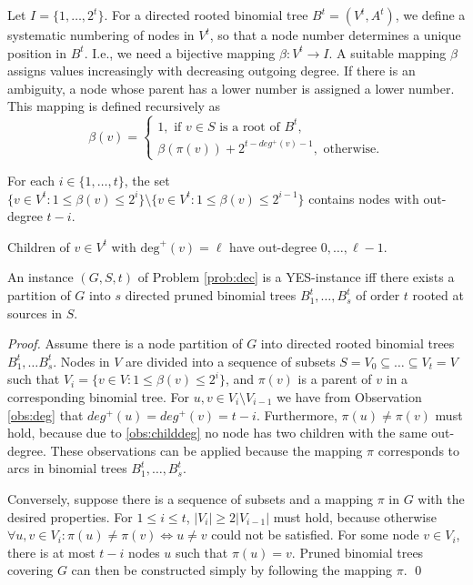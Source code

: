 Let $I=\{1,\dots,2^t\}$.
For a directed rooted binomial tree $B^t=(V^t,A^t)$, we define a systematic numbering of nodes in $V^t$, so that a node number determines a unique position in $B^t$.
I.e., we need a bijective mapping $\beta: V^t \to I$.
A suitable mapping $\beta$ assigns values increasingly with decreasing outgoing degree. 
If there is an ambiguity, a node whose parent has a lower number is assigned a lower number.
This mapping is defined recursively as
\begin{equation}
\label{eq:beta}
\beta(v)=\begin{cases}
1,\text{ if } v\in S \text{ is a root of } B^t,\\
\beta(\pi(v)) + 2^{t-deg^+(v)-1}, \text{ otherwise}.
\end{cases}
\end{equation}
\begin{observation}\label{obs:deg}
For each $i\in\{1,\dots,t\}$, the set $\{v\in V^t: 1\leq\beta(v)\leq2^i\}\setminus\{v\in V^t:1\leq\beta(v)\leq2^{i-1}\}$ contains nodes with out-degree $t-i$.
\end{observation}
\begin{observation}\label{obs:childdeg}
Children of $v\in V^t$ with $\text{deg}^+(v)=\ell$ have out-degree $0,\dots,\ell-1$.
\end{observation}
\begin{proposition}\label{lem:probeq}
An instance $(G,S,t)$ of Problem \ref{prob:dec} is a YES-instance iff 
there exists a partition of $G$ into $s$ directed pruned binomial trees $B^t_1,\dots,B^t_{s}$ of order $t$ rooted at sources in $S$.
\end{proposition}
\begin{proof}
Assume there is a node partition of $G$ into directed rooted binomial trees $B^t_1,\dots B^t_{s}$. 
Nodes in $V$ are divided into a sequence of subsets $S=V_0\subseteq\dots\subseteq V_t=V$ such that $V_i=\{v\in V:1\leq\beta(v)\leq 2^i\}$,
and $\pi(v)$ is a parent of $v$ in a corresponding binomial tree.
For $u,v\in V_i\setminus V_{i-1}$ we have from Observation \ref{obs:deg} that $deg^+(u)=deg^+(v)=t-i$.
Furthermore, $\pi(u)\neq \pi(v)$ must hold, because due to \ref{obs:childdeg} no node has two children with the same out-degree.
These observations can be applied because the mapping $\pi$ corresponds to arcs in binomial trees $B^t_1,\dots,B^t_{s}$. 

Conversely, suppose there is a sequence of subsets and a mapping $\pi$ in $G$ with the desired properties.
For $1\leq i\leq t$, $|V_i|\geq2|V_{i-1}|$ must hold, because otherwise $\forall u,v\in V_i:\pi(u)\neq \pi(v)\Leftrightarrow u\neq v$ could not be satisfied.
For some node $v\in V_i$, there is at most $t-i$ nodes $u$ such that $\pi(u)=v$.
Pruned binomial trees covering $G$ can then be constructed simply by following the mapping $\pi$.
\qed
\end{proof}

